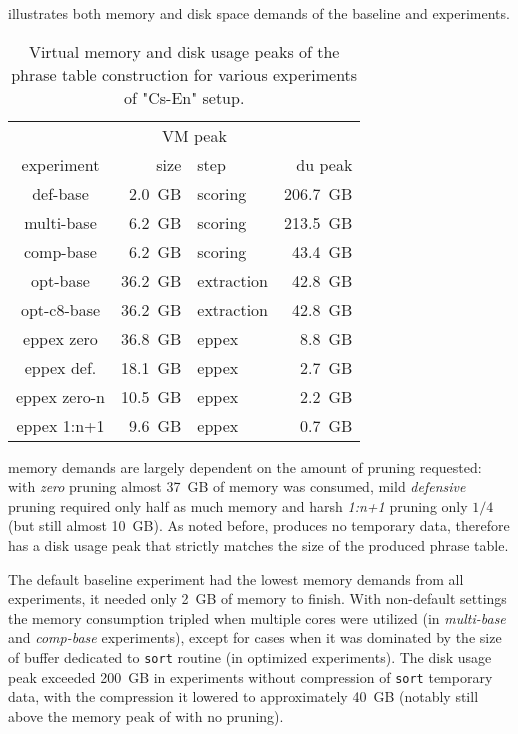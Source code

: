  illustrates both memory and disk space demands of the baseline
and \eppex{} experiments.

\begin{table}[ht]
\centering
\begin{tabular}{ | c | r l | r | }
\hline
 & \multicolumn{2}{|c|}{VM peak} & \\
experiment & size & step & du peak \\
\hline
\hline
def-base       &  2.0~GB &    scoring & 206.7~GB \\
multi-base     &  6.2~GB &    scoring & 213.5~GB \\
comp-base      &  6.2~GB &    scoring &  43.4~GB \\
opt-base       & 36.2~GB & extraction &  42.8~GB \\
opt-c8-base    & 36.2~GB & extraction &  42.8~GB \\
eppex zero     & 36.8~GB &      eppex &   8.8~GB \\
\hline
eppex def.     & 18.1~GB &      eppex &   2.7~GB \\
eppex zero-n   & 10.5~GB &      eppex &   2.2~GB \\
eppex 1:n+1    &  9.6~GB &      eppex &   0.7~GB \\
\hline
\end{tabular}
\caption{\label{cs-en-wmt13-vm-and-disk-usage-peaks}
Virtual memory and disk usage peaks of the phrase table construction for various experiments of "Cs-En" setup.}
\end{table}

\Eppex{} memory demands are largely dependent on the amount of pruning requested: with \emph{zero}
pruning almost 37~GB of memory was consumed, mild \emph{defensive} pruning required only half as much
memory and harsh \emph{1:n+1} pruning only $1/4$ (but still almost 10~GB).
As noted before, \eppex{} produces no temporary data, therefore has a disk usage peak that strictly
matches the size of the produced phrase table.

The default baseline experiment had the lowest memory demands from all experiments, it needed only 2~GB
of memory to finish.
With non-default settings the memory consumption tripled when multiple cores were utilized (in \emph{multi-base}
and \emph{comp-base} experiments), except for cases when it was dominated by the size of buffer dedicated
to \texttt{sort} routine (in optimized experiments).
The disk usage peak exceeded 200~GB in experiments without compression of \texttt{sort} temporary data,
with the compression it lowered to approximately 40~GB (notably still above the memory peak of \eppex{}
with no pruning).

